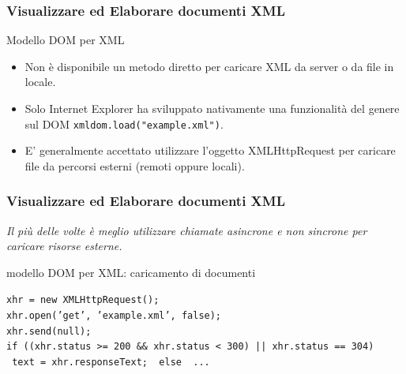 \begin{frame}
    \frametitle{Visualizzare ed Elaborare documenti XML}
    \addtocounter{nframe}{1}
    

     \begin{block}{Modello DOM per XML}
        \begin{itemize}
            \item Non è disponibile un metodo diretto per caricare XML da server o da file in locale. 
            \item Solo Internet Explorer ha sviluppato nativamente una funzionalità del genere sul DOM \texttt{xmldom.load("example.xml")}.
            \item E' generalmente accettato utilizzare l'oggetto XMLHttpRequest per caricare file da percorsi esterni (remoti oppure locali).
        \end{itemize}
        
     \end{block}

     
\end{frame}

\begin{frame}
    \frametitle{Visualizzare ed Elaborare documenti XML}
    \addtocounter{nframe}{1}
    

    \textit{Il più delle volte è meglio utilizzare chiamate asincrone e non sincrone per caricare risorse esterne.}

     \begin{block}{modello DOM per XML: caricamento di documenti}
       
        \texttt{xhr = new XMLHttpRequest();}
        \\\texttt{xhr.open('get', 'example.xml', false);} 
        \\\texttt{xhr.send(null);}
        \\\texttt{if ((xhr.status >= 200 \&\& xhr.status < 300) || xhr.status == 304)}
        \\\texttt{{ text = xhr.responseText; } else { ... }}
        
     \end{block}
     
\end{frame}
     

